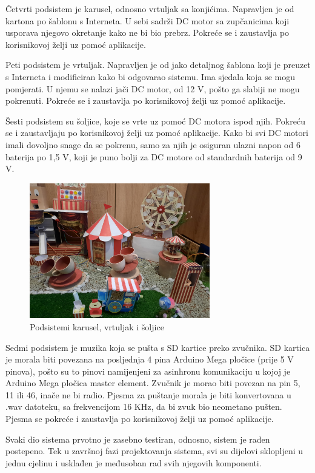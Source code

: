 Četvrti podsistem je karusel, odnosno vrtuljak sa konjićima. Napravljen je od kartona po šablonu s Interneta. U sebi sadrži DC motor sa zupčanicima koji usporava njegovo okretanje kako ne bi bio prebrz. Pokreće se i zaustavlja po korisnikovoj želji uz pomoć aplikacije.

Peti podsistem je vrtuljak. Napravljen je od jako detaljnog šablona koji je preuzet s Interneta i modificiran kako bi odgovarao sistemu. Ima sjedala koja se mogu pomjerati. U njemu se nalazi jači DC motor, od 12 V, pošto ga slabiji ne mogu pokrenuti. Pokreće se i zaustavlja po korisnikovoj želji uz pomoć aplikacije.

Šesti podsistem su šoljice, koje se vrte uz pomoć DC motora ispod njih. Pokreću se i zaustavljaju po korisnikovoj želji uz pomoć aplikacije. Kako bi svi DC motori imali dovoljno snage da se pokrenu, samo za njih je osiguran ulazni napon od 6 baterija po 1,5 V, koji je puno bolji za DC motore od standardnih baterija od 9 V. 

\begin{figure}[h!]
  \centering
  \includegraphics[width=0.7\textwidth]{pod2}
  \caption{Podsistemi  karusel, vrtuljak i šoljice}
  \label{fig:Slika_pod2}
\end{figure}

Sedmi podsistem je muzika koja se pušta s SD kartice preko zvučnika. SD kartica je morala biti povezana na posljednja 4 pina Arduino Mega pločice (prije 5 V pinova), pošto su to pinovi namijenjeni za asinhronu komunikaciju u kojoj je Arduino Mega pločica master element. Zvučnik je morao biti povezan na pin 5, 11 ili 46, inače ne bi radio. Pjesma za puštanje morala je biti konvertovana u .wav datoteku, sa frekvencijom 16 KHz, da bi zvuk bio neometano pušten. Pjesma se pokreće i zaustavlja po korisnikovoj želji uz pomoć aplikacije.

Svaki dio sistema prvotno je zasebno testiran, odnosno, sistem je rađen postepeno. Tek u završnoj fazi projektovanja sistema, svi su dijelovi sklopljeni u jednu cjelinu i usklađen je međusoban rad svih njegovih komponenti.

